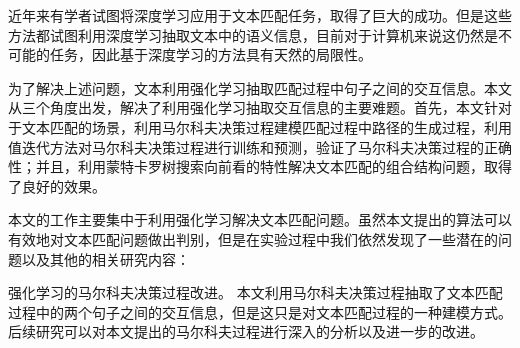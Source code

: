 近年来有学者试图将深度学习应用于文本匹配任务，取得了巨大的成功。但是这些方法都试图利用深度学习抽取文本中的语义信息，目前对于计算机来说这仍然是不可能的任务，因此基于深度学习的方法具有天然的局限性。

为了解决上述问题，文本利用强化学习抽取匹配过程中句子之间的交互信息。本文从三个角度出发，解决了利用强化学习抽取交互信息的主要难题。首先，本文针对于文本匹配的场景，利用马尔科夫决策过程建模匹配过程中路径的生成过程，利用值迭代方法对马尔科夫决策过程进行训练和预测，验证了马尔科夫决策过程的正确性；并且，利用蒙特卡罗树搜索向前看的特性解决文本匹配的组合结构问题，取得了良好的效果。

本文的工作主要集中于利用强化学习解决文本匹配问题。虽然本文提出的算法可以有效地对文本匹配问题做出判别，但是在实验过程中我们依然发现了一些潜在的问题以及其他的相关研究内容：

强化学习的马尔科夫决策过程改进。
本文利用马尔科夫决策过程抽取了文本匹配过程中的两个句子之间的交互信息，但是这只是对文本匹配过程的一种建模方式。后续研究可以对本文提出的马尔科夫过程进行深入的分析以及进一步的改进。



%
%
